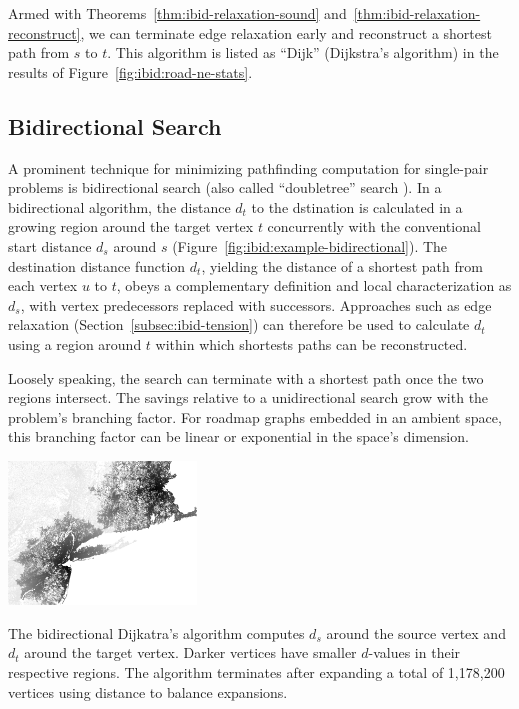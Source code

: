 Armed with Theorems~\ref{thm:ibid-relaxation-sound}
and~\ref{thm:ibid-relaxation-reconstruct},
we can terminate edge relaxation early
and reconstruct a shortest path from $s$ to $t$.
This algorithm is listed as ``Dijk''
(Dijkstra's algorithm)
in the results of Figure~\ref{fig:ibid:road-ne-stats}.

\subsection{Bidirectional Search}
\label{sec:ibid:bidirectional}

A prominent technique for minimizing pathfinding computation for
single-pair problems
is bidirectional search
(also called ``doubletree'' search \citep{doran1966doubletree}).
In a bidirectional algorithm,
the distance $d_t$ to the dstination is calculated in a growing region
around the target vertex $t$
concurrently with the conventional start distance $d_s$ around $s$
(Figure~\ref{fig:ibid:example-bidirectional}).
The destination distance function $d_t$,
yielding the distance of a shortest path from each vertex $u$ to $t$,
obeys a complementary definition and local characterization as $d_s$,
with vertex predecessors replaced with successors.
Approaches such as edge relaxation (Section~\ref{subsec:ibid-tension})
can therefore be used to calculate $d_t$ using a region around $t$
within which shortests paths can be reconstructed.

Loosely speaking,
the search can terminate with a shortest path
once the two regions intersect.
The savings relative to a unidirectional search grow with the problem's
branching factor.
For roadmap graphs embedded in an ambient space,
this branching factor can be linear or exponential in the space's
dimension.
\begin{marginfigure}%
   \centering%
   \includegraphics[width=5cm]{figs/incbi-road-ne/singleshot/example-bidijkstra.png}%
   \caption{The bidirectional Dijkatra's algorithm
      computes $d_s$ around the source vertex
      and $d_t$ around the target vertex.
      Darker vertices have smaller $d$-values in their respective
      regions.
      The algorithm terminates after expanding a total of
      1,178,200 vertices using distance to balance expansions.}%
   \label{fig:ibid:example-bidirectional}%
\end{marginfigure}


